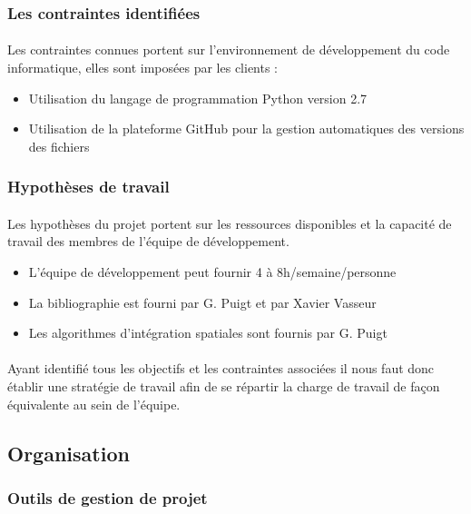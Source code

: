     \subsubsection{Les contraintes identifiées}
    \paragraph{}
    Les contraintes connues portent sur l'environnement de développement du code informatique, elles sont imposées par les clients :
    \begin{itemize}
   	    \item Utilisation du langage de programmation Python version 2.7
   	    \item Utilisation de la plateforme GitHub pour la gestion automatiques des versions des fichiers
    \end{itemize}

    \subsubsection{Hypothèses de travail}
    \paragraph{}
    Les hypothèses du projet portent sur les ressources disponibles et la capacité de travail des membres de l'équipe de développement.
    \begin{itemize}
   	    \item L'équipe de développement peut fournir 4 à 8h/semaine/personne
   	    \item La bibliographie est fourni par G. Puigt et par Xavier Vasseur
   	    \item  Les algorithmes d'intégration spatiales sont fournis par G. Puigt
    \end{itemize}
    \paragraph{}
    Ayant identifié tous les objectifs et les contraintes associées il nous faut donc établir une stratégie de travail afin de se répartir la charge de travail de façon équivalente au sein de l'équipe. 


\subsection{Organisation}

    \subsubsection{Outils de gestion de projet}
